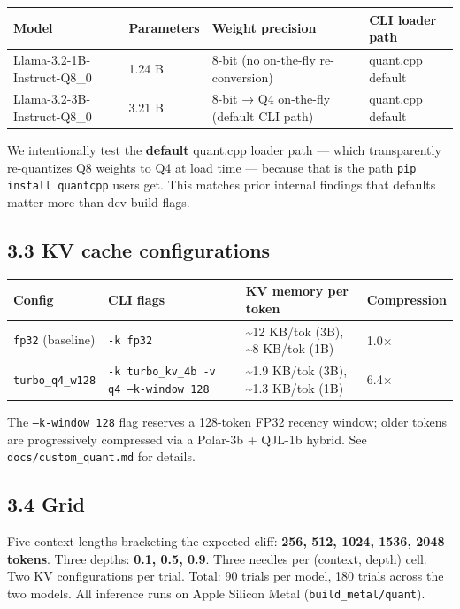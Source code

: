\documentclass[11pt]{article}
\begin{document}
\begin{center}
\begin{tabular}{llll}
\toprule
Model & Parameters & Weight precision & CLI loader path \\
\midrule
Llama-3.2-1B-Instruct-Q8\_0 & 1.24 B & 8-bit (no on-the-fly re-conversion) & quant.cpp default \\
Llama-3.2-3B-Instruct-Q8\_0 & 3.21 B & 8-bit → Q4 on-the-fly (default CLI path) & quant.cpp default \\
\bottomrule
\end{tabular}
\end{center}


We intentionally test the \textbf{default} quant.cpp loader path — which transparently re-quantizes Q8 weights to Q4 at load time — because that is the path \texttt{pip install quantcpp} users get. This matches prior internal findings that defaults matter more than dev-build flags.


\subsection*{3.3 KV cache configurations}


\begin{center}
\begin{tabular}{llll}
\toprule
Config & CLI flags & KV memory per token & Compression \\
\midrule
\texttt{fp32} (baseline) & \texttt{-k fp32} & \textasciitilde{}12 KB/tok (3B), \textasciitilde{}8 KB/tok (1B) & 1.0× \\
\texttt{turbo\_q4\_w128} & \texttt{-k turbo\_kv\_4b -v q4 --k-window 128} & \textasciitilde{}1.9 KB/tok (3B), \textasciitilde{}1.3 KB/tok (1B) & 6.4× \\
\bottomrule
\end{tabular}
\end{center}


The \texttt{--k-window 128} flag reserves a 128-token FP32 recency window; older tokens are progressively compressed via a Polar-3b + QJL-1b hybrid. See \texttt{docs/custom\_quant.md} for details.


\subsection*{3.4 Grid}


Five context lengths bracketing the expected cliff: \textbf{256, 512, 1024, 1536, 2048 tokens}. Three depths: \textbf{0.1, 0.5, 0.9}. Three needles per (context, depth) cell. Two KV configurations per trial. Total: 90 trials per model, 180 trials across the two models. All inference runs on Apple Silicon Metal (\texttt{build\_metal/quant}).
\end{document}
